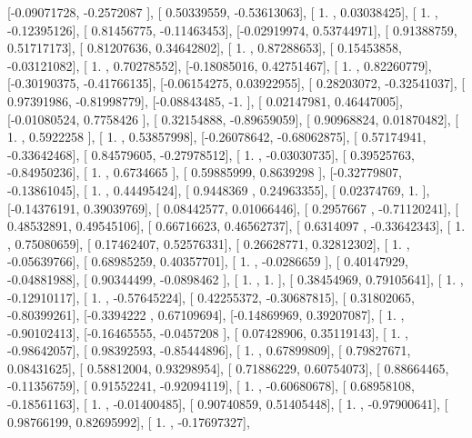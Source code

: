 \documentclass{article}
\begin{document}
       [-0.09071728, -0.2572087 ],
       [ 0.50339559, -0.53613063],
       [ 1.        ,  0.03038425],
       [ 1.        , -0.12395126],
       [ 0.81456775, -0.11463453],
       [-0.02919974,  0.53744971],
       [ 0.91388759,  0.51717173],
       [ 0.81207636,  0.34642802],
       [ 1.        ,  0.87288653],
       [ 0.15453858, -0.03121082],
       [ 1.        ,  0.70278552],
       [-0.18085016,  0.42751467],
       [ 1.        ,  0.82260779],
       [-0.30190375, -0.41766135],
       [-0.06154275,  0.03922955],
       [ 0.28203072, -0.32541037],
       [ 0.97391986, -0.81998779],
       [-0.08843485, -1.        ],
       [ 0.02147981,  0.46447005],
       [-0.01080524,  0.7758426 ],
       [ 0.32154888, -0.89659059],
       [ 0.90968824,  0.01870482],
       [ 1.        ,  0.5922258 ],
       [ 1.        ,  0.53857998],
       [-0.26078642, -0.68062875],
       [ 0.57174941, -0.33642468],
       [ 0.84579605, -0.27978512],
       [ 1.        , -0.03030735],
       [ 0.39525763, -0.84950236],
       [ 1.        ,  0.6734665 ],
       [ 0.59885999,  0.8639298 ],
       [-0.32779807, -0.13861045],
       [ 1.        ,  0.44495424],
       [ 0.9448369 ,  0.24963355],
       [ 0.02374769,  1.        ],
       [-0.14376191,  0.39039769],
       [ 0.08442577,  0.01066446],
       [ 0.2957667 , -0.71120241],
       [ 0.48532891,  0.49545106],
       [ 0.66716623,  0.46562737],
       [ 0.6314097 , -0.33642343],
       [ 1.        ,  0.75080659],
       [ 0.17462407,  0.52576331],
       [ 0.26628771,  0.32812302],
       [ 1.        , -0.05639766],
       [ 0.68985259,  0.40357701],
       [ 1.        , -0.0286659 ],
       [ 0.40147929, -0.04881988],
       [ 0.90344499, -0.0898462 ],
       [ 1.        ,  1.        ],
       [ 0.38454969,  0.79105641],
       [ 1.        , -0.12910117],
       [ 1.        , -0.57645224],
       [ 0.42255372, -0.30687815],
       [ 0.31802065, -0.80399261],
       [-0.3394222 ,  0.67109694],
       [-0.14869969,  0.39207087],
       [ 1.        , -0.90102413],
       [-0.16465555, -0.0457208 ],
       [ 0.07428906,  0.35119143],
       [ 1.        , -0.98642057],
       [ 0.98392593, -0.85444896],
       [ 1.        ,  0.67899809],
       [ 0.79827671,  0.08431625],
       [ 0.58812004,  0.93298954],
       [ 0.71886229,  0.60754073],
       [ 0.88664465, -0.11356759],
       [ 0.91552241, -0.92094119],
       [ 1.        , -0.60680678],
       [ 0.68958108, -0.18561163],
       [ 1.        , -0.01400485],
       [ 0.90740859,  0.51405448],
       [ 1.        , -0.97900641],
       [ 0.98766199,  0.82695992],
       [ 1.        , -0.17697327],
\end{document}
